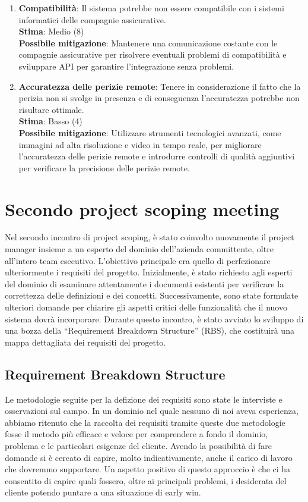 \documentclass[a4paper,12pt, openright]{report}
\begin{document}
\begin{enumerate}
    \item \textbf{Compatibilità}: Il sistema potrebbe non essere compatibile con i sistemi informatici delle compagnie assicurative.
    \\
    \textbf{Stima}: Medio (8)
    \\
    \textbf{Possibile mitigazione}: Mantenere una comunicazione costante con le compagnie assicurative per risolvere eventuali problemi di compatibilità e sviluppare API per garantire l'integrazione senza problemi. 

    \item \textbf{Accuratezza delle perizie remote}: Tenere in considerazione il fatto che la perizia non si svolge in presenza e di conseguenza l'accuratezza potrebbe non risultare ottimale.
    \\
    \textbf{Stima}: Basso (4)
    \\
    \textbf{Possibile mitigazione}: Utilizzare strumenti tecnologici avanzati, come immagini ad alta risoluzione e video in tempo reale, per migliorare l'accuratezza delle perizie remote e introdurre controlli di qualità aggiuntivi per verificare la precisione delle perizie remote.
\end{enumerate}

\section{Secondo project scoping meeting}
Nel secondo incontro di project scoping, è stato coinvolto nuovamente il project manager insieme a un esperto del dominio dell'azienda committente, oltre all'intero team esecutivo. L'obiettivo principale era quello di perfezionare ulteriormente i requisiti del progetto. Inizialmente, è stato richiesto agli esperti del dominio di esaminare attentamente i documenti esistenti per verificare la correttezza delle definizioni e dei concetti. Successivamente, sono state formulate ulteriori domande per chiarire gli aspetti critici delle funzionalità che il nuovo sistema dovrà incorporare. Durante questo incontro, è stato avviato lo sviluppo di una bozza della ``Requirement Breakdown Structure'' (RBS), che costituirà una mappa dettagliata dei requisiti del progetto.

\subsection{Requirement Breakdown Structure}
Le metodologie seguite per la defizione dei requisiti sono state le interviste e osservazioni sul campo. In un dominio nel quale nessuno di noi aveva esperienza, abbiamo ritenuto che la raccolta dei requisiti tramite queste due metodologie fosse il metodo più efficace e veloce per comprendere a fondo il dominio, problema e le particolari esigenze del cliente. Avendo la possibilità di fare domande si è cercato di capire, molto indicativamente, anche il carico di lavoro che dovremmo supportare. 
Un aspetto positivo di questo approccio è che ci ha consentito di capire quali fossero, oltre ai principali problemi, i desiderata del cliente potendo puntare a una situazione di early win. 
\end{document}
